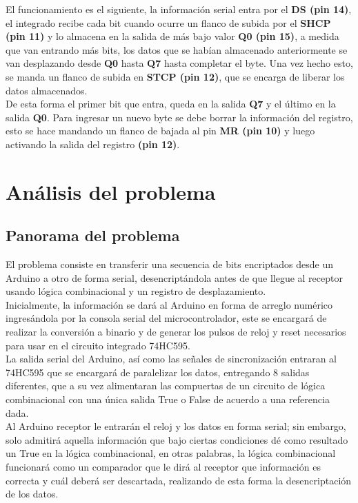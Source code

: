 \documentclass{article}
\begin{document}
El funcionamiento es el siguiente, la información serial entra por el \textbf{DS (pin 14)}, el integrado recibe cada bit cuando ocurre un flanco de subida por el \textbf{SHCP (pin 11)} y lo almacena en la salida de más bajo valor \textbf{Q0 (pin 15)}, a medida que van entrando más bits, los datos que se habían almacenado anteriormente se van desplazando desde \textbf{Q0} hasta \textbf{Q7} hasta completar el byte. Una vez hecho esto, se manda un flanco de subida en \textbf{STCP (pin 12)}, que se encarga de liberar los datos almacenados.\\

\noindent De esta forma el primer bit que entra, queda en la salida \textbf{Q7} y el último en la salida \textbf{Q0}.
Para ingresar un nuevo byte se debe borrar la información del registro, esto se hace mandando un flanco de bajada al pin \textbf{MR (pin 10)} y luego activando la salida del registro \textbf{(pin 12)}.\cite{74hc595datasheet}

\section{Análisis del problema} \label{analisis}

\subsection{Panorama del problema}


El problema consiste en transferir una secuencia de bits encriptados desde un Arduino a otro de forma serial, desencriptándola antes de que llegue al receptor usando lógica combinacional y un registro de desplazamiento.\\

Inicialmente, la información se dará al Arduino en forma de arreglo numérico ingresándola por la consola serial del microcontrolador, este se encargará de realizar la conversión a binario y de generar los pulsos de reloj y reset necesarios para usar en el circuito integrado 74HC595.\\

La salida serial del Arduino, así como las señales de sincronización entraran al 74HC595 que se encargará de paralelizar los datos, entregando 8 salidas diferentes, que a su vez alimentaran las compuertas de un circuito de lógica combinacional con una única salida True o False de acuerdo a una referencia dada.\\

Al Arduino receptor le entrarán el reloj y los datos en forma serial; sin embargo, solo admitirá aquella información que bajo ciertas condiciones dé como resultado un True en la lógica combinacional, en otras palabras, la lógica combinacional funcionará como un comparador que le dirá al receptor que información es correcta y cuál deberá ser descartada, realizando de esta forma la desencriptación de los datos.\\
\end{document}
